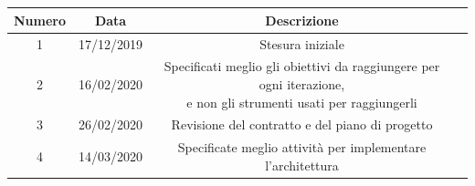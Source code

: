 \clearpage
{} \\ \\
\begin{tabular}{|c | c | c | c|} 
 	\hline
	 Numero & Data & Descrizione \\ [0.5ex] 
	\hline\hline
	1 & 17/12/2019 & Stesura iniziale \\ 
	\hline
	2 & 16/02/2020 & \thead{Specificati meglio gli obiettivi da raggiungere per ogni iterazione,\\e non gli strumenti usati per raggiungerli} \\ 
	\hline
	3 & 26/02/2020 & Revisione del contratto e del piano di progetto \\ 
	\hline
	4 & 14/03/2020 & Specificate meglio attività per implementare l'architettura\\
	\hline
\end{tabular}